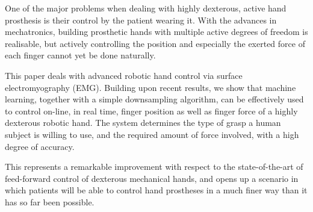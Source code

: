 One of the major problems when dealing with highly dexterous, active
hand prosthesis is their control by the patient wearing it. With the
advances in mechatronics, building prosthetic hands with multiple
active degrees of freedom is realisable, but actively controlling the
position and especially the exerted force of each finger cannot yet
be done naturally.

This paper deals with advanced robotic hand control via surface
electromyography (EMG). Building upon recent results, we show that
machine learning, together with a simple downsampling algorithm, can
be effectively used to control on-line, in real time, finger position
as well as finger force of a highly dexterous robotic hand. The system
determines the type of grasp a human subject is willing to use, and
the required amount of force involved, with a high degree of accuracy.

This represents a remarkable improvement with respect to the
state-of-the-art of feed-forward control of dexterous mechanical
hands, and opens up a scenario in which patients will be able to
control hand prostheses in a much finer way than it has so far been
possible.
